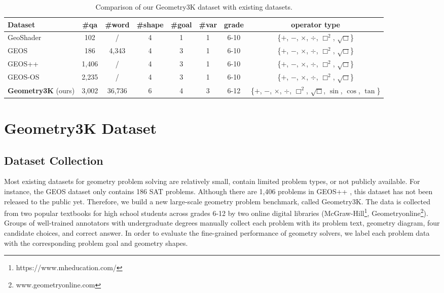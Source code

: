 \documentclass[11pt,a4paper]{article}
\begin{document}

\begin{table}[th!]
\centering 
\setlength{\tabcolsep}{3pt}
\small 
\begin{tabular}{l|ccccccc}
	\hline
	\textbf{Dataset} & \#qa & \#word & \#shape & \#goal & \#var & grade & operator type \\ 
	\hline
	GeoShader \cite{alvin2017synthesis} & 102 & / & 4 & 1 & 1 & 6-10  & \{$+$, $-$, $\times$, $\div$, $\Box^2$, $\sqrt\Box$\} \\
	GEOS \cite{seo2015solving} & 186 & 4,343 & 4 & 3 & 1 & 6-10  & \{$+$, $-$, $\times$, $\div$, $\Box^2$, $\sqrt\Box$\} \\ 
	GEOS++ \cite{sachan2017textbooks} & 1,406 & / & 4 & 3 & 1 & 6-10 & \{$+$, $-$, $\times$, $\div$, $\Box^2$, $\sqrt\Box$\} \\
	GEOS-OS \cite{sachan2017learning} & 2,235 & / & 4 & 3 & 1 & 6-10 & \{$+$, $-$, $\times$, $\div$, $\Box^2$, $\sqrt\Box$\} \\
	\textbf{Geometry3K} (ours) & 3,002 & 36,736 & 6 & 4 & 3 & 6-12 & \footnotesize \{$+$, $-$, $\times$, $\div$, $\Box^2$, $\sqrt\Box$, $\sin$, $\cos$, $\tan$\} \\
	\hline
\end{tabular}
\vspace{0mm}
\caption{Comparison of our Geometry3K dataset with existing datasets. }
\vspace{0mm}
\label{table:dataset}
\end{table}

\section{Geometry3K Dataset}
\subsection{Dataset Collection}\label{sec:dataset}
Most existing datasets for geometry problem solving are relatively small, contain limited problem types, or not publicly available. For instance, the GEOS dataset \citep{seo2015solving} only contains 186 SAT problems. Although there are 1,406 problems in GEOS++ \citep{sachan2017textbooks}, this dataset has not been released to the public yet. Therefore, we build a new large-scale geometry problem benchmark, called Geometry3K. The data is collected from two popular textbooks for high school students across grades 6-12 by two online digital libraries (McGraw-Hill\footnote{https://www.mheducation.com/}, Geometryonline\footnote{www.geometryonline.com }). Groups of well-trained annotators with undergraduate degrees manually collect each problem with its problem text, geometry diagram, four candidate choices, and correct answer. 
In order to evaluate the fine-grained performance of geometry solvers, we label each problem data with the corresponding  problem goal and geometry shapes. 
\end{document}
